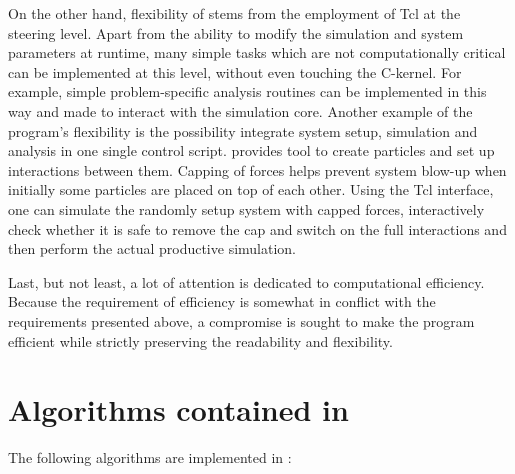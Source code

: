 On the other hand, flexibility of \es stems from the employment of Tcl at
the steering level. Apart from the ability to modify the simulation and
system parameters at runtime, many simple tasks which are not computationally
critical can be implemented at this level, without even touching the C-kernel.
For example, simple problem-specific analysis routines can be implemented
in this way and made to interact with the simulation core.
Another example of the program's flexibility is the possibility  integrate
system setup, simulation and analysis in one single control script. \es
provides tool to create particles and set up interactions between them. 
Capping of forces helps prevent system blow-up when initially some particles
are placed on top of each other. Using the Tcl interface, one can simulate
the randomly setup system with capped forces, interactively check whether
it is safe to remove the cap and switch on the full interactions and then 
perform the actual productive simulation.

Last, but not least, a lot of attention is dedicated to computational
efficiency. Because the requirement of efficiency is somewhat in conflict
with the requirements presented above, a compromise is sought to make the
program efficient while strictly preserving the readability and flexibility.

%

\section{Algorithms contained in \es}

The following algorithms are implemented in \es{}:

